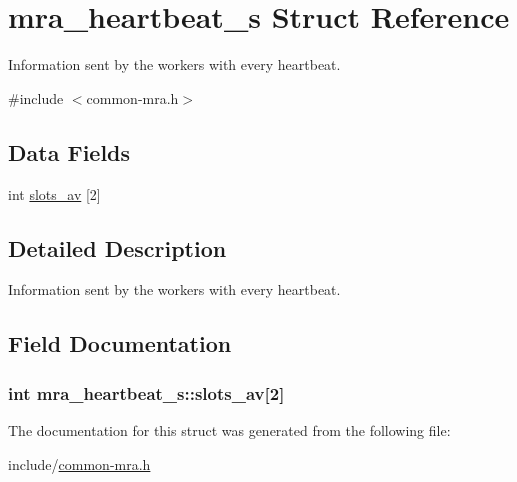 \hypertarget{structmra__heartbeat__s}{\section{mra\-\_\-heartbeat\-\_\-s \-Struct \-Reference}
\label{structmra__heartbeat__s}
}


\-Information sent by the workers with every heartbeat.  




{\ttfamily \#include $<$common-\/mra.\-h$>$}

\subsection*{\-Data \-Fields}
\begin{DoxyCompactItemize}
\item 
int \hyperlink{structmra__heartbeat__s_a4807e7c902185697b22776045965e1a6}{slots\-\_\-av} \mbox{[}2\mbox{]}
\end{DoxyCompactItemize}


\subsection{\-Detailed \-Description}
\-Information sent by the workers with every heartbeat. 

\subsection{\-Field \-Documentation}
\hypertarget{structmra__heartbeat__s_a4807e7c902185697b22776045965e1a6}{
\subsubsection[{slots\-\_\-av}]{\setlength{\rightskip}{0pt plus 5cm}int {\bf mra\-\_\-heartbeat\-\_\-s\-::slots\-\_\-av}\mbox{[}2\mbox{]}}}\label{structmra__heartbeat__s_a4807e7c902185697b22776045965e1a6}


\-The documentation for this struct was generated from the following file\-:\begin{DoxyCompactItemize}
\item 
include/\hyperlink{common-mra_8h}{common-\/mra.\-h}\end{DoxyCompactItemize}
